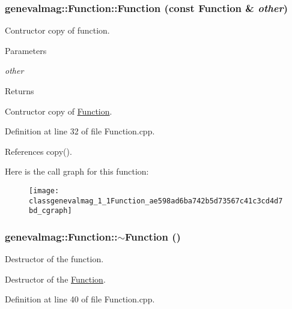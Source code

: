 \hypertarget{classgenevalmag_1_1Function_ae598ad6ba742b5d73567c41c3cd4d7bd}{
\subsubsection[{Function}]{\setlength{\rightskip}{0pt plus 5cm}genevalmag::Function::Function (const {\bf Function} \& {\em other})}}
\label{classgenevalmag_1_1Function_ae598ad6ba742b5d73567c41c3cd4d7bd}
Contructor copy of function. 
\begin{DoxyParams}{Parameters}
\item[{\em other}]\end{DoxyParams}
\begin{DoxyReturn}{Returns}

\end{DoxyReturn}
Contructor copy of \hyperlink{classgenevalmag_1_1Function}{Function}. 

Definition at line 32 of file Function.cpp.



References copy().



Here is the call graph for this function:\nopagebreak
\begin{figure}[H]
\begin{center}
\leavevmode
\texttt{[image: classgenevalmag\_1\_1Function\_ae598ad6ba742b5d73567c41c3cd4d7bd\_cgraph]}
\end{center}
\end{figure}


\hypertarget{classgenevalmag_1_1Function_a318a1979861665429179979f9d678f3e}{
\subsubsection[{$\sim$Function}]{\setlength{\rightskip}{0pt plus 5cm}genevalmag::Function::$\sim$Function ()}}
\label{classgenevalmag_1_1Function_a318a1979861665429179979f9d678f3e}
Destructor of the function.

Destructor of the \hyperlink{classgenevalmag_1_1Function}{Function}. 

Definition at line 40 of file Function.cpp.



